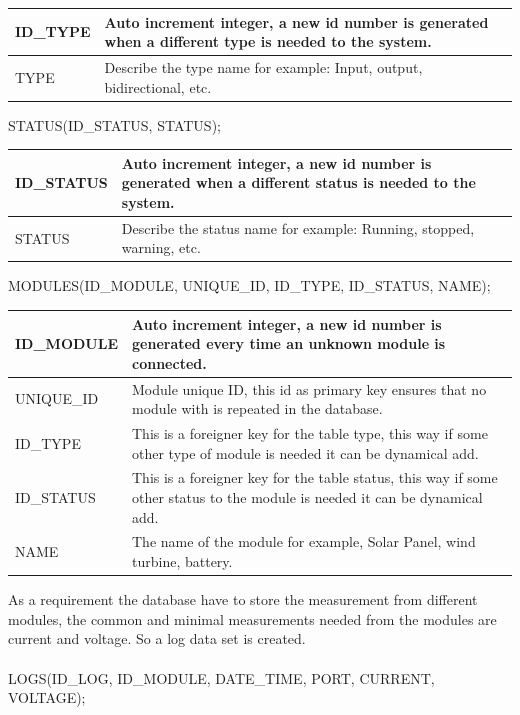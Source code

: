 \begin{table}[H]
\centering
	\begin{tabular}{| p{2cm} | p{10cm} |}
		\hline
		ID\_TYPE & Auto increment integer, a new id number is generated when a different type is needed to the system. \\\hline
		TYPE & Describe the type name for example: Input, output, bidirectional, etc.\\\hline
	\end{tabular}
\end{table}

STATUS(ID\_STATUS, STATUS);

\begin{table}[H]
\centering
	\begin{tabular}{| p{2cm} | p{10cm} |}
		\hline
		ID\_STATUS & Auto increment integer, a new id number is generated when a different status is needed to the system. \\\hline
		STATUS & Describe the status name for example: Running, stopped, warning, etc.\\\hline
	\end{tabular}
\end{table}


MODULES(ID\_MODULE, UNIQUE\_ID, ID\_TYPE, ID\_STATUS, NAME);

\begin{table}[H]
\centering
	\begin{tabular}{| p{2cm} | p{10cm} |}
		\hline
		ID\_MODULE & Auto increment integer, a new id number is generated every time an unknown module is connected. \\\hline
		UNIQUE\_ID & Module unique ID, this id as primary key ensures that no module with is repeated in the database.\\\hline
		ID\_TYPE & This is a foreigner key for the table type, this way if some other type of module is needed it can be dynamical add. \\\hline
		ID\_STATUS & This is a foreigner key for the table status, this way if some other status to the module is needed it can be dynamical add. \\\hline
		NAME & The name of the module for example, Solar Panel, wind turbine, battery. \\\hline
	\end{tabular}
\end{table}
As a requirement the database have to store the measurement  from different modules, the common and minimal measurements needed from the modules are current and voltage. So a log data set is created.
\\\\
LOGS(ID\_LOG, ID\_MODULE, DATE\_TIME, PORT, CURRENT, VOLTAGE);

